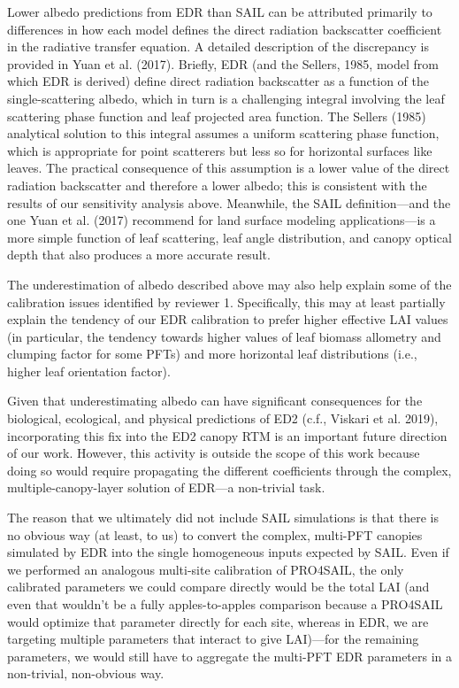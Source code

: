 Lower albedo predictions from EDR than SAIL can be attributed primarily to differences in how each model defines the direct radiation backscatter coefficient in the radiative transfer equation. A detailed description of the discrepancy is provided in Yuan et al. (2017). Briefly, EDR (and the Sellers, 1985, model from which EDR is derived) define direct radiation backscatter as a function of the single-scattering albedo, which in turn is a challenging integral involving the leaf scattering phase function and leaf projected area function. The Sellers (1985) analytical solution to this integral assumes a uniform scattering phase function, which is appropriate for point scatterers but less so for horizontal surfaces like leaves. The practical consequence of this assumption is a lower value of the direct radiation backscatter and therefore a lower albedo; this is consistent with the results of our sensitivity analysis above. Meanwhile, the SAIL definition---and the one Yuan et al. (2017) recommend for land surface modeling applications---is a more simple function of leaf scattering, leaf angle distribution, and canopy optical depth that also produces a more accurate result.

The underestimation of albedo described above may also help explain some of the calibration issues identified by reviewer 1. Specifically, this may at least partially explain the tendency of our EDR calibration to prefer higher effective LAI values (in particular, the tendency towards higher values of leaf biomass allometry and clumping factor for some PFTs) and more horizontal leaf distributions (i.e., higher leaf orientation factor).

Given that underestimating albedo can have significant consequences for the biological, ecological, and physical predictions of ED2 (c.f., Viskari et al. 2019), incorporating this fix into the ED2 canopy RTM is an important future direction of our work. However, this activity is outside the scope of this work because doing so would require propagating the different coefficients through the complex, multiple-canopy-layer solution of EDR---a non-trivial task.

The reason that we ultimately did not include SAIL simulations is that there is no obvious way (at least, to us) to convert the complex, multi-PFT canopies simulated by EDR into the single homogeneous inputs expected by SAIL. Even if we performed an analogous multi-site calibration of PRO4SAIL, the only calibrated parameters we could compare directly would be the total LAI (and even that wouldn’t be a fully apples-to-apples comparison because a PRO4SAIL would optimize that parameter directly for each site, whereas in EDR, we are targeting multiple parameters that interact to give LAI)---for the remaining parameters, we would still have to aggregate the multi-PFT EDR parameters in a non-trivial, non-obvious way.

